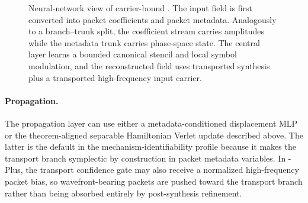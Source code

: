 \begin{figure}[t]
{
}
\caption{Neural-network view of carrier-bound \MiNO.  The input field is first converted into packet coefficients and packet metadata.  Analogously to a branch--trunk split, the coefficient stream carries amplitudes while the metadata trunk carries phase-space state.  The central layer learns a bounded canonical stencil and local symbol modulation, and the reconstructed field uses transported synthesis plus a transported high-frequency input carrier.}
\label{fig:mino-network-view}
\end{figure}

\paragraph{Propagation.}
The propagation layer can use either a metadata-conditioned displacement MLP or the theorem-aligned separable Hamiltonian Verlet update described above.  The latter is the default in the mechanism-identifiability profile because it makes the transport branch symplectic by construction in packet metadata variables.  In \MiNO-Plus, the transport confidence gate may also receive a normalized high-frequency packet bias, so wavefront-bearing packets are pushed toward the transport branch rather than being absorbed entirely by post-synthesis refinement.


